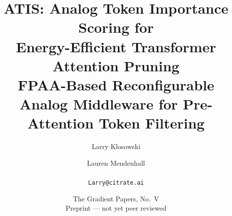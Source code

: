 

\title{\textbf{ATIS: Analog Token Importance Scoring for\\ Energy-Efficient Transformer Attention Pruning}\\[4pt]
\large FPAA-Based Reconfigurable Analog Middleware for Pre-Attention Token Filtering}
\author{Larry Klosowski \and Lauren Mendenhall\\[2pt]\CitrateAffil\\ \texttt{Larry@citrate.ai}}
\date{The Gradient Papers, No.~V \\ Preprint --- not yet peer reviewed}


\maketitle


